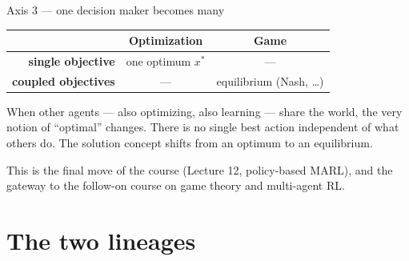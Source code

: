 \documentclass[10pt, aspectratio=169]{beamer}
\begin{document}
\begin{frame}{Axis 3 --- one decision maker becomes many}
\begin{center}\footnotesize\renewcommand{\arraystretch}{1.5}
\begin{tabular}{r|c|c}
 & \textbf{Optimization} & \textbf{Game} \\
\hline
\textbf{single objective}  & one optimum $x^*$ & --- \\
\hline
\textbf{coupled objectives} & --- & \cellcolor{mDarkTeal!12}equilibrium (Nash, \dots) \\
\end{tabular}
\end{center}
\medskip

\pause
When other agents --- also optimizing, also learning --- share the world, the very notion of ``optimal'' changes. There is no single best action independent of what others do. The solution concept shifts from an \alert{optimum} to an \alert{equilibrium}.
\medskip

\pause
This is the final move of the course (Lecture 12, policy-based MARL), and the gateway to the follow-on course on game theory and multi-agent RL.
\end{frame}

\section{The two lineages}
\end{document}
